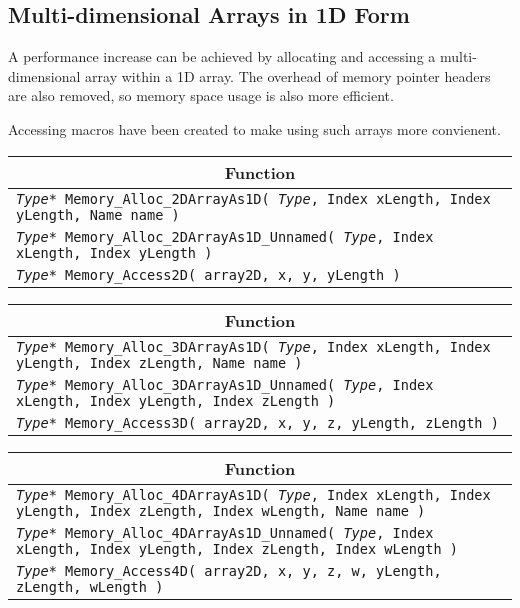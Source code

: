 \documentclass[a4paper,12pt]{article}
\begin{document}
\subsection{Multi-dimensional Arrays in 1D Form}
A performance increase can be achieved by allocating and accessing a multi-dimensional array within a 1D array. The overhead of memory pointer headers are also removed, so memory space usage is also more efficient.

Accessing macros have been created to make using such arrays more convienent.
\begin{table}[h]
  \begin{tabular}{|p{13.3cm}|}
    \hline \multicolumn{1}{|c|}{\textbf{Function}} \\ \hline
    \texttt{\textit{Type}* Memory\_Alloc\_2DArrayAs1D( \textit{Type}, Index xLength, Index yLength, Name name )} \\ \hline
    \texttt{\textit{Type}* Memory\_Alloc\_2DArrayAs1D\_Unnamed( \textit{Type}, Index xLength, Index yLength )} \\ \hline
    \texttt{\textit{Type}* Memory\_Access2D( array2D, x, y, yLength )} \\ \hline
  \end{tabular}
\end{table}

\begin{table}[h]
  \begin{tabular}{|p{13.3cm}|}
    \hline \multicolumn{1}{|c|}{\textbf{Function}} \\ \hline
    \texttt{\textit{Type}* Memory\_Alloc\_3DArrayAs1D( \textit{Type}, Index xLength, Index yLength, Index zLength, Name name )} \\ \hline
    \texttt{\textit{Type}* Memory\_Alloc\_3DArrayAs1D\_Unnamed( \textit{Type}, Index xLength, Index yLength, Index zLength )} \\ \hline
    \texttt{\textit{Type}* Memory\_Access3D( array2D, x, y, z, yLength, zLength )} \\ \hline
  \end{tabular}
\end{table}

\begin{table}[h]
  \begin{tabular}{|p{13.3cm}|}
    \hline \multicolumn{1}{|c|}{\textbf{Function}} \\ \hline
    \texttt{\textit{Type}* Memory\_Alloc\_4DArrayAs1D( \textit{Type}, Index xLength, Index yLength, Index zLength, Index wLength, Name name )} \\ \hline
    \texttt{\textit{Type}* Memory\_Alloc\_4DArrayAs1D\_Unnamed( \textit{Type}, Index xLength, Index yLength, Index zLength, Index wLength )} \\ \hline
    \texttt{\textit{Type}* Memory\_Access4D( array2D, x, y, z, w, yLength, zLength, wLength )} \\ \hline
  \end{tabular}
\end{table}
\end{document}
